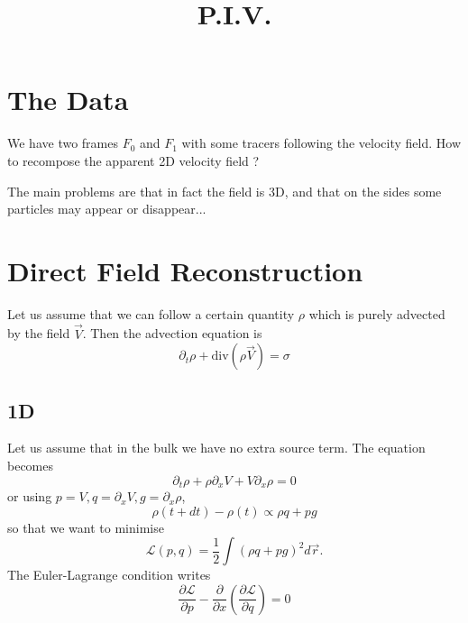 \documentclass[aps,twocolumn]{revtex4}
\begin{document}
\title{P.I.V.}

\section{The Data}
We have two frames $F_0$ and $F_1$ with some tracers following the
velocity field. How to recompose the apparent 2D velocity field ?

The main problems are that in fact the field is 3D, and that
on the sides some particles may appear or disappear...

\section{Direct Field Reconstruction}
Let us assume that we can follow a certain quantity $\rho$ which is purely advected by
the field $\vec{V}$.
Then the advection equation is
$$
\partial_t \rho + \mathrm{div}\left(\rho\vec{V}\right) = \sigma
$$

\subsection{1D}
Let us assume that in the bulk we have no extra source term.
The equation becomes
$$
	\partial_t \rho + \rho \partial_x V + V \partial_x \rho = 0
$$
or using $p=V,q=\partial_x V,g=\partial_x\rho$,
$$
	\rho(t+dt) - \rho(t) \propto  \rho q + p g
$$
so that we want to minimise
$$
	\mathcal{L}(p,q) = \dfrac{1}{2}\int (\rho q + p g)^2 d\vec{r}.
$$
The Euler-Lagrange condition writes
$$
	\dfrac{\partial \mathcal{L}}{\partial p} -
	\dfrac{\partial}{\partial x} \left( \dfrac{\partial \mathcal{L}}{\partial q}\right) = 0
$$
\end{document}
